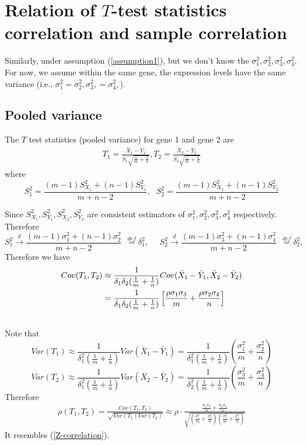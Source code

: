 \documentclass[12pt,oneside]{book}
\begin{document}
\section*{Relation of $T$-test statistics correlation and sample correlation}
Similarly, under assumption (\ref{assumption1}), but we don't know the $\sigma_1^2, \sigma_2^2,\sigma_3^2, \sigma_4^2$. For now, we assume within the same gene, the expression levels have the same variance (i.e., $\sigma_1^2=\sigma_2^2, \sigma_3^2,=\sigma_4^2,$). 

\subsection*{Pooled variance}
The $T$ test statistics (pooled variance) for gene 1 and gene 2 are 
\begin{align}\label{t-test}
 T_1 = \frac{\bar{X}_1 - \bar{Y}_1}{S_1\sqrt{\frac{1}{m}+\frac{1}{n}}},  T_2 = \frac{\bar{X}_2-\bar{Y}_2}{S_2\sqrt{\frac{1}{m}+\frac{1}{n}}}
\end{align}
where 
\[S_1^2 =\frac{(m-1)S_{X_1}^2+ (n-1)S_{Y_1}^2}{m+n-2}, ~~~ S_2^2 =\frac{(m-1)S_{X_2}^2+ (n-1)S_{Y_2}^2}{m+n-2}\]

Since $S_{X_1}^2, S_{Y_1}^2, S_{X_2}^2, S_{Y_2}^2$ are consistent estimators of $\sigma_1^2, \sigma_2^2,\sigma_3^2, \sigma_4^2$ respectively. Therefore 
\[    S_1^2  \stackrel {d}{ \rightarrow} \frac{(m-1)\sigma_1^2 +(n-1)\sigma_2^2}{m + n -2}~~ \stackrel{def}{=}\delta_1^2,  ~~~~~~  S_2^2  \stackrel {d}{ \rightarrow} \frac{(m-1)\sigma_3^2 +(n-1)\sigma_4^2}{m + n -2}~~ \stackrel{def}{=}\delta_2^2, \]
Therefore we have   
\begin{align*}
Cov(T_1, T_2) & \approx \frac{1}{\delta_1\delta_2 (\frac{1}{m} + \frac{1}{n})}Cov(\bar{X}_1 - \bar{Y}_1, \bar{X}_2 - \bar{Y}_2) \\ \notag
& = \frac{1}{\delta_1\delta_2 (\frac{1}{m} + \frac{1}{n})} \left[\frac{\rho\sigma_1\sigma_3 }{m} + \frac{\rho \sigma_2 \sigma_4}{n}\right] \\ \notag
\end{align*}
Note that 
\[Var(T_1) \approx \frac{1}{\delta_1^2(\frac{1}{m} + \frac{1}{n})}Var(\bar{X}_1 -\bar{Y}_1) = \frac{1}{\delta_1^2(\frac{1}{m} + \frac{1}{n})} (\frac{\sigma_1^2}{m} + \frac{\sigma_2^2}{n}) \]
\[Var(T_2) \approx \frac{1}{\delta_1^2(\frac{1}{m} + \frac{1}{n})}Var(\bar{X}_2 -\bar{Y}_2) = \frac{1}{\delta_2^2(\frac{1}{m} + \frac{1}{n})} (\frac{\sigma_3^2}{m} + \frac{\sigma_4^2}{n}) \]
Therefore 
\begin{align}\label{T-correlation}
\rho(T_1, T_2)  = \frac{Cov(T_1, T_2)}{\sqrt{Var(T_1)Var(T_2)}} \approx \rho \cdot \frac{\frac{\sigma_1\sigma_3 }{m} + \frac{\sigma_2 \sigma_4}{n}}{\sqrt{(\frac{\sigma^2_1}{m} + \frac{\sigma^2_2}{n})(\frac{\sigma^2_3}{m} + \frac{\sigma^2_4}{n})}}
\end{align}
It resembles (\ref{Z-correlation}). 
\end{document}
